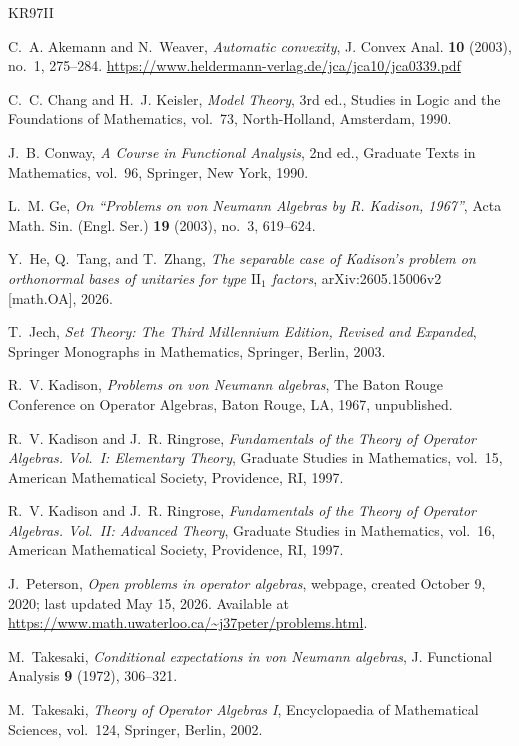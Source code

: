 \documentclass[11pt,letterpaper,reqno]{amsart}
\theoremstyle{definition}
\numberwithin{equation}{section}
\begin{document}
\begin{thebibliography}{KR97II}

C.~A. Akemann and N.~Weaver,
\emph{Automatic convexity},
J. Convex Anal. \textbf{10} (2003), no.~1, 275--284.
\url{https://www.heldermann-verlag.de/jca/jca10/jca0339.pdf}

C.~C. Chang and H.~J. Keisler,
\emph{Model Theory}, 3rd ed.,
Studies in Logic and the Foundations of Mathematics, vol.~73, North-Holland,
Amsterdam, 1990.

J.~B. Conway,
\emph{A Course in Functional Analysis},
2nd ed., Graduate Texts in Mathematics, vol.~96, Springer, New York, 1990.



L.~M. Ge,
\emph{On ``Problems on von Neumann Algebras by R. Kadison, 1967''},
Acta Math. Sin. (Engl. Ser.) \textbf{19} (2003), no.~3, 619--624.

Y.~He, Q.~Tang, and T.~Zhang,
\emph{The separable case of Kadison's problem on orthonormal bases of
unitaries for type $\mathrm{II}_1$ factors},
arXiv:2605.15006v2 [math.OA], 2026.

T.~Jech,
\emph{Set Theory: The Third Millennium Edition, Revised and Expanded},
Springer Monographs in Mathematics, Springer, Berlin, 2003.

R.~V. Kadison,
\emph{Problems on von Neumann algebras},
The Baton Rouge Conference on Operator Algebras, Baton Rouge, LA, 1967,
unpublished.

R.~V. Kadison and J.~R. Ringrose,
\emph{Fundamentals of the Theory of Operator Algebras. Vol.~I: Elementary Theory},
Graduate Studies in Mathematics, vol.~15, American Mathematical Society,
Providence, RI, 1997.

R.~V. Kadison and J.~R. Ringrose,
\emph{Fundamentals of the Theory of Operator Algebras. Vol.~II: Advanced Theory},
Graduate Studies in Mathematics, vol.~16, American Mathematical Society,
Providence, RI, 1997.

J.~Peterson,
\emph{Open problems in operator algebras},
webpage, created October 9, 2020; last updated May 15, 2026.
Available at \url{https://www.math.uwaterloo.ca/~j37peter/problems.html}.

M.~Takesaki,
\emph{Conditional expectations in von Neumann algebras},
J. Functional Analysis \textbf{9} (1972), 306--321.

M.~Takesaki,
\emph{Theory of Operator Algebras I},
Encyclopaedia of Mathematical Sciences, vol.~124, Springer, Berlin, 2002.

\end{thebibliography}
\end{document}
